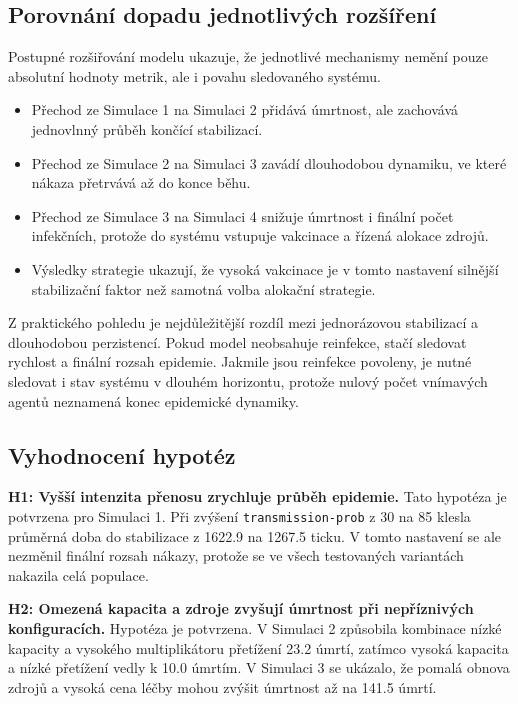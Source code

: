 \documentclass{article}
\begin{document}
\subsection{Porovnání dopadu jednotlivých rozšíření}

Postupné rozšiřování modelu ukazuje, že jednotlivé mechanismy nemění pouze
absolutní hodnoty metrik, ale i povahu sledovaného systému.

\begin{itemize}
\item Přechod ze Simulace 1 na Simulaci 2 přidává úmrtnost, ale zachovává
jednovlnný průběh končící stabilizací.
\item Přechod ze Simulace 2 na Simulaci 3 zavádí dlouhodobou dynamiku, ve které
nákaza přetrvává až do konce běhu.
\item Přechod ze Simulace 3 na Simulaci 4 snižuje úmrtnost i finální počet
infekčních, protože do systému vstupuje vakcinace a řízená alokace zdrojů.
\item Výsledky strategie ukazují, že vysoká vakcinace je v tomto nastavení
silnější stabilizační faktor než samotná volba alokační strategie.
\end{itemize}

Z praktického pohledu je nejdůležitější rozdíl mezi jednorázovou stabilizací
a dlouhodobou perzistencí. Pokud model neobsahuje reinfekce, stačí sledovat
rychlost a finální rozsah epidemie. Jakmile jsou reinfekce povoleny, je nutné
sledovat i stav systému v dlouhém horizontu, protože nulový počet vnímavých
agentů neznamená konec epidemické dynamiky.

\subsection{Vyhodnocení hypotéz}

\textbf{H1: Vyšší intenzita přenosu zrychluje průběh epidemie.}
Tato hypotéza je potvrzena pro Simulaci 1. Při zvýšení
\texttt{transmission-prob} z 30 na 85 klesla průměrná doba do stabilizace
z 1622.9 na 1267.5 ticku. V tomto nastavení se ale nezměnil finální rozsah
nákazy, protože se ve všech testovaných variantách nakazila celá populace.

\textbf{H2: Omezená kapacita a zdroje zvyšují úmrtnost při nepříznivých
konfiguracích.} Hypotéza je potvrzena. V Simulaci 2 způsobila kombinace nízké
kapacity a vysokého multiplikátoru přetížení 23.2 úmrtí, zatímco vysoká kapacita
a nízké přetížení vedly k 10.0 úmrtím. V Simulaci 3 se ukázalo, že pomalá obnova
zdrojů a vysoká cena léčby mohou zvýšit úmrtnost až na 141.5 úmrtí.
\end{document}
